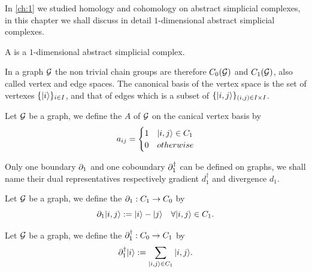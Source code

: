 \documentclass[../2.tex]{subfiles}
\begin{document}
    In \autoref{ch:1} we studied homology and cohomology on abstract simplicial complexes, in this chapter we shall discuss in detail
    $1$-dimensional abstract simplicial complexes.

    \begin{defn}
        A  is a $1$-dimensional abstract simplicial complex.
    \end{defn}

    In a graph $\mathcal{G}$ the non trivial chain groups are therefore $C_0(\mathcal{G})$ and $C_1(\mathcal{G})$, also called vertex and edge spaces. 
    The canonical basis of the vertex space is the set of vertexes $\{| i \rangle\}_{i \in I}$, and that of edges which is a subset of $\{| i,j \rangle\}_{(i,j)\in I\times I}$.

    \begin{defn}
        Let $\mathcal{G}$ be a graph, we define the  $A$ of $\mathcal{G}$ on the canical vertex basis by
        \[a_{ij} = 
        \begin{cases}
            1 & | i,j \rangle \in C_1 \\
            0 & otherwise \\
        \end{cases} \]        
    \end{defn}
    Only one boundary $\partial_1$ and one coboundary $\partial_1^\dagger$ can be defined on graphs, we shall name their dual representatives  respectively gradient $d_1^\dagger$ and divergence $d_1$.

    \begin{defn}
        Let $\mathcal{G}$ be a graph, we define the  $\partial_1 : C_1 \to C_0$ by 
        \[ \partial_1| i,j \rangle := | i \rangle - | j \rangle \quad \forall | i,j \rangle \in C_1.\]
    \end{defn}
    
    \begin{defn}
        Let $\mathcal{G}$ be a graph, we define the  $\partial^\dagger_1 : C_0 \to C_1$ by 
        \[ \partial^\dagger_1| i \rangle := \sum_{| i,j \rangle \in C_1} | i,j \rangle.\]
    \end{defn}



\end{document}
